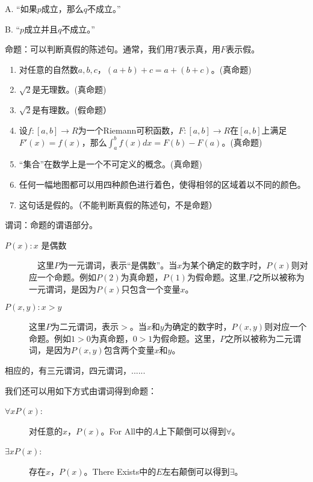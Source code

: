 \documentclass{beamer}
\begin{document}
\begin{CJK*}{UTF8}{gbsn}
\begin{frame}
  A. “如果$p$成立，那么$q$不成立。”

  B. “$p$成立并且$q$不成立。”
\end{frame}
\begin{frame}
    命题：可以判断真假的陈述句。通常，我们用$T$表示真，用$F$表示假。
  \begin{Ex}\quad   
    \begin{enumerate}
    \item 对任意的自然数$a,b,c$，$(a + b) + c = a + (b + c)$。(真命题)
    \item $\sqrt{2}$是无理数。(真命题)
    \item $\sqrt{2}$是有理数。(假命题）
    \item 设$f:[a,b] \to R$为一个Riemann可积函数，$F:[a,b] \to R$在$[a,b]$上满足$F'(x)=f(x)$，那么$\int_{a}^{b}f(x)dx = F(b) - F(a)$。(真命题)
    \item “集合”在数学上是一个不可定义的概念。(真命题)
    \item 任何一幅地图都可以用四种颜色进行着色，使得相邻的区域着以不同的颜色。
    \item 这句话是假的。（不能判断真假的陈述句，不是命题）
    \end{enumerate}
  \end{Ex}
\end{frame}
\begin{frame}
    谓词：命题的谓语部分。
  
  \begin{Ex}\quad
    
    \begin{description}
    \item     [$P(x): x$ 是偶数]　这里$P$为一元谓词，表示“是偶数”。当$x$为某个确定的数字时，$P(x)$则对应一个命题。例如$P(2)$为真命题，$P(1)$为假命题。这里,$P$之所以被称为一元谓词，是因为$P(x)$只包含一个变量$x$。
    \item     [$P(x,y): x >y$]  这里$P$为二元谓词，表示$>$。当$x$和$y$为确定的数字时，$P(x,y)$则对应一个命题。例如$1>0$为真命题，$0>1$为假命题。这里，$P$之所以被称为二元谓词，是因为$P(x,y)$包含两个变量$x$和$y$。
    \end{description}
相应的，有三元谓词，四元谓词，......
\end{Ex}
\end{frame}
\begin{frame}
  我们还可以用如下方式由谓词得到命题：

\begin{description}
\item [$\forall x P(x)$:] 对任意的$x$，$P(x)$。For All中的$A$上下颠倒可以得到$\forall$。
\item [$\exists x P(x)$:] 存在$x$，$P(x)$。There Exists中的$E$左右颠倒可以得到$\exists$。
\end{description}


\end{frame}
\end{CJK*}
\end{document}

